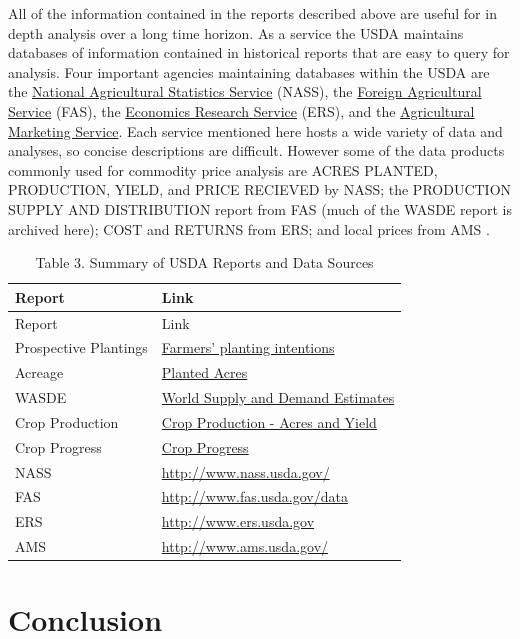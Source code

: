 \documentclass[]{book}
\theoremstyle{definition}
\theoremstyle{definition}
\theoremstyle{remark}
\begin{document}
All of the information contained in the reports described above are
useful for in depth analysis over a long time horizon. As a service the
USDA maintains databases of information contained in historical reports
that are easy to query for analysis. Four important agencies maintaining
databases within the USDA are the
\href{http://www.nass.usda.gov/}{National Agricultural Statistics
Service} (NASS), the
\href{http://apps.fas.usda.gov/psdonline/psdHome.aspx}{Foreign
Agricultural Service} (FAS), the
\href{http://www.ers.usda.gov/data-products.aspx}{Economics Research
Service} (ERS), and the
\href{http://www.ams.usda.gov/market-news/livestock-poultry-grain\#Grain}{Agricultural
Marketing Service}. Each service mentioned here hosts a wide variety of
data and analyses, so concise descriptions are difficult. However some
of the data products commonly used for commodity price analysis are
ACRES PLANTED, PRODUCTION, YIELD, and PRICE RECIEVED by NASS; the
PRODUCTION SUPPLY AND DISTRIBUTION report from FAS (much of the WASDE
report is archived here); COST and RETURNS from ERS; and local prices
from AMS .

\begin{longtable}[]{@{}ll@{}}
\caption{Table 3. Summary of USDA Reports and Data
Sources}\tabularnewline
\toprule
Report & Link\tabularnewline
\midrule
\endfirsthead
\toprule
Report & Link\tabularnewline
\midrule
\endhead
Prospective Plantings &
\href{http://usda.mannlib.cornell.edu/MannUsda/viewDocumentInfo.do?documentID=1136}{Farmers'
planting intentions}\tabularnewline
Acreage &
\href{http://usda.mannlib.cornell.edu/MannUsda/viewDocumentInfo.do?documentID=1000}{Planted
Acres}\tabularnewline
WASDE &
\href{http://usda.mannlib.cornell.edu/MannUsda/viewDocumentInfo.do?documentID=1194}{World
Supply and Demand Estimates}\tabularnewline
Crop Production &
\href{http://usda.mannlib.cornell.edu/MannUsda/viewDocumentInfo.do?documentID=1046}{Crop
Production - Acres and Yield}\tabularnewline
Crop Progress &
\href{http://www.nass.usda.gov/Publications/National_Crop_Progress/}{Crop
Progress}\tabularnewline
NASS & \url{http://www.nass.usda.gov/}\tabularnewline
FAS & \url{http://www.fas.usda.gov/data}\tabularnewline
ERS &
\href{http://www.ers.usda.gov/data-products.aspx}{http://www.ers.usda.gov}\tabularnewline
AMS &
\href{http://www.ams.usda.gov/market-news/livestock-poultry-grain\#Grain}{http://www.ams.usda.gov/}\tabularnewline
\bottomrule
\end{longtable}

\section{Conclusion}\label{conclusion}
\end{document}
